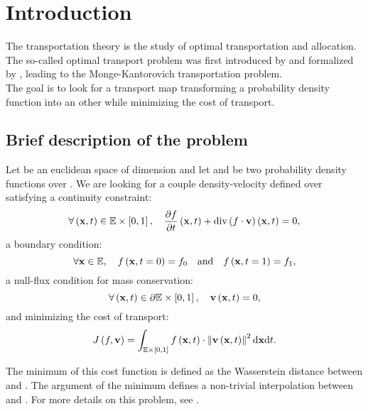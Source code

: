 
\section{Introduction}
\noindent

    The transportation theory is the study of optimal transportation and allocation.
    The so-called optimal transport problem was first introduced by \cite{monge-1781} and formalized
    by \cite{kantorovich-1942}, leading to the Monge-Kantorovich transportation problem.\\

    The goal is to look for a transport map transforming a probability density function into an other
    while minimizing the cost of transport.

    \subsection{Brief description of the problem}
    \noindent

        Let \spaceE{} be an euclidean space of dimension \dimension{} and let \fI{} and \fII{} be two probability density functions over \spaceE{}.
        We are looking for a couple density-velocity \coupleFV{} defined over \EtimesT{} satisfying a continuity constraint:
        \begin{equation}
            \label{eq:continuity}
            \forall \left(\mathbf{x},t\right) \in \mathbb{E}\times\left[0,1\right], \quad \frac{\partial f}{\partial t} \left(\mathbf{x},t\right) + \mathrm{div}\left(f\cdot\mathbf{v}\right) \left(\mathbf{x},t\right) = 0,
        \end{equation}
        a boundary condition:
        \begin{equation}
            \label{eq:boundaries}
            \forall \mathbf{x} \in \mathbb{E}, \quad f\left(\mathbf{x}, t = 0\right) = f_0 \quad\text{and}\quad f\left(\mathbf{x}, t = 1\right) = f_1,
        \end{equation}
        a null-flux condition for mass conservation:
        \begin{equation}
            \label{eq:null-flux}
            \forall \left(\mathbf{x},t\right) \in \partial\mathbb{E}\times\left[0,1\right], \quad \mathbf{v}\left(\mathbf{x},t\right) = 0,
        \end{equation}
        and minimizing the cost of transport:
        \begin{equation}
            \label{eq:cost}
            J \left(f,\mathbf{v}\right) = \int_{\mathbb{E}\times\left[0,1\right]} f \left(\mathbf{x},t\right) \cdot \left\| \mathbf{v} \left(\mathbf{x},t\right) \right\|^2 {\rm d}\mathbf{x} {\rm d}t.
        \end{equation}

        The minimum of this cost function is defined as the Wasserstein distance between \fI{} and \fII{}. The argument \fstar{} of the
        minimum defines a non-trivial interpolation between \fI{} and \fII{}.
        For more details on this problem, see \cite{benamou-2000, villani-2008, farchi-2016}.

